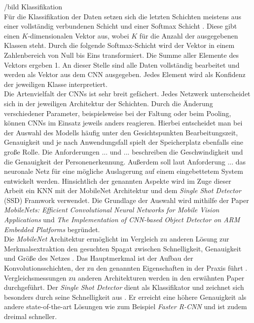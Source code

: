 		/bild Klassifikation\\
		
		Für die Klassifikation der Daten setzen sich die letzten Schichten meistens aus einer vollständig verbundenen Schicht und einer Softmax Schicht \cite{deeplearning}. Diese gibt einen $K$-dimensionalen Vektor aus, wobei $K$ für die Anzahl der ausgegebenen Klassen steht. Durch die folgende Softmax-Schicht wird der Vektor in einem Zahlenbereich von Null bis Eins transformiert. Die Summe aller Elemente des Vektors ergeben 1. An dieser Stelle sind alle Daten vollständig bearbeitet und werden als Vektor aus dem CNN ausgegeben. Jedes Element wird als Konfidenz der jeweiligen Klasse interpretiert. \\
		
		Die Artenvielfalt der CNNs ist sehr breit gefächert. Jedes Netzwerk unterscheidet sich in der jeweiligen Architektur der Schichten. Durch die Änderung verschiedener Parameter, beispielsweise bei der Faltung oder beim Pooling, können CNNs im Einsatz jeweils anders reagieren. Hierbei entscheidet man bei der Auswahl des Modells häufig unter den Gesichtspunkten Bearbeitungszeit, Genauigkeit und je nach Anwendungsfall spielt der Speicherplatz ebenfalls eine große Rolle. Die Anforderungen ... und ... beschreiben die Geschwindigkeit und die Genauigkeit der Personenerkennung. Außerdem soll laut Anforderung ... das neuronale Netz für eine mögliche Auslagerung auf einem eingebettetem System entwickelt werden. Hinsichtlich der genannten Aspekte wird im Zuge dieser Arbeit ein KNN mit der MobileNet Architektur und dem \textit{Single Shot Detector} (SSD) Framwork verwendet. Die Grundlage der Auswahl wird mithilfe der Paper \textit{MobileNets: Efficient Convolutional Neural Networks for  Mobile Vision Applications} \cite{mobilenets} und \textit{The Implementation of CNN-based Object Detector on ARM Embedded Platforms} \cite{embedded} begründet.\\
		
		Die \textit{MobileNet} Architektur ermöglicht im Vergleich zu anderen Lösung zur Merkmalsextraktion den gesuchten Spagat zwischen Schnelligkeit, Genauigkeit und Größe des Netzes \cite{mobilenets}. Das Hauptmerkmal ist der Aufbau der Konvolutionsschichten, der zu den genannten Eigenschaften in der Praxis führt \cite{mobilenets} \cite{embedded}. Vergleichsmessungen zu anderen Architekturen werden in den erwähnten Paper durchgeführt. Der \textit{Single Shot Detector} dient als Klassifikator und zeichnet sich besonders durch seine Schnelligkeit aus \cite{ssd}. Er erreicht eine höhere Genauigkeit als andere state-of-the-art Lösungen wie zum Beispiel \textit{Faster R-CNN} \cite{fastercnn} und ist zudem dreimal schneller\cite{ssd}.		
		
